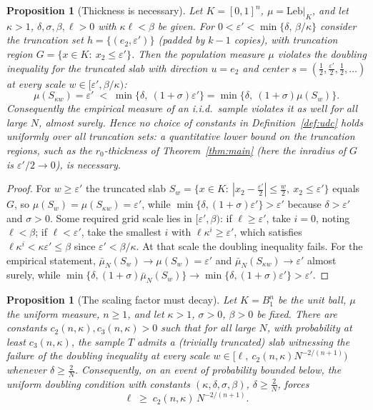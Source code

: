 \documentclass[11pt]{article}
\newtheorem{proposition}[theorem]{Proposition}
\newcommand{\emp}{\bar\mu_N}
\begin{document}
\begin{proposition}[Thickness is necessary]\label{prop:sliver}
Let $K=[0,1]^n$, $\mu=\mathrm{Leb}|_K$, and let $\kappa>1$,
$\delta,\sigma,\beta,\ell>0$ with $\kappa\ell<\beta$ be given.  For
$0<\varepsilon'<\min\{\delta,\,\beta/\kappa\}$ consider the truncation set
$h=\{(e_2,\varepsilon')\}$ (padded by $k-1$ copies), with truncation region
$G=\{x\in K:\ x_2\le\varepsilon'\}$.  Then the \emph{population} measure $\mu$
violates the doubling inequality for the truncated slab with direction $u=e_2$ and
center $s=(\tfrac12,\tfrac{\varepsilon'}2,\tfrac12,\dots)$ at every scale
$w\in[\varepsilon',\beta/\kappa)$:
\[
\mu(S_{\kappa w})=\varepsilon'
\;<\;\min\{\delta,\ (1+\sigma)\varepsilon'\}
=\min\{\delta,\ (1+\sigma)\mu(S_w)\}.
\]
Consequently the empirical measure of an i.i.d.\ sample violates it as well for all
large $N$, almost surely.  Hence no choice of constants in
Definition~\ref{def:udc} holds uniformly over all truncation sets: a quantitative
lower bound on the truncation regions, such as the $r_0$-thickness of
Theorem~\ref{thm:main} (here the inradius of $G$ is $\varepsilon'/2\to0$), is
necessary.
\end{proposition}

\begin{proof}
For $w\ge\varepsilon'$ the truncated slab
$S_w=\{x\in K:\ |x_2-\tfrac{\varepsilon'}2|\le\tfrac w2,\ x_2\le\varepsilon'\}$
equals $G$, so $\mu(S_w)=\mu(S_{\kappa w})=\varepsilon'$, while
$\min\{\delta,(1+\sigma)\varepsilon'\}>\varepsilon'$ because
$\delta>\varepsilon'$ and $\sigma>0$.  Some required grid scale lies in
$[\varepsilon',\beta)$: if $\ell\ge\varepsilon'$, take $i=0$, noting
$\ell<\beta$; if $\ell<\varepsilon'$, take the smallest $i$ with
$\ell\kappa^i\ge\varepsilon'$, which satisfies
$\ell\kappa^i<\kappa\varepsilon'\le\beta$ since $\varepsilon'<\beta/\kappa$.  At
that scale the doubling inequality fails.  For the empirical
statement, $\emp(S_w)\to\mu(S_w)=\varepsilon'$ and
$\emp(S_{\kappa w})\to\varepsilon'$ almost surely, while
$\min\{\delta,(1+\sigma)\emp(S_w)\}\to\min\{\delta,(1+\sigma)\varepsilon'\}
>\varepsilon'$.
\end{proof}

\begin{proposition}[The scaling factor must decay]\label{prop:gap}
Let $K=B^n_1$ be the unit ball, $\mu$ the uniform measure, $n\ge1$, and let
$\kappa>1$, $\sigma>0$, $\beta>0$ be fixed.  There are constants
$c_2(n,\kappa),c_3(n,\kappa)>0$ such that for all large $N$, with probability at
least $c_3(n,\kappa)$, the sample $T$ admits a (trivially truncated) slab witnessing the failure
of the doubling inequality at every scale
$w\in\bigl[\ell,\ c_2(n,\kappa)N^{-2/(n+1)}\bigr)$ whenever $\delta\ge\frac2N$.
Consequently, on an event of probability bounded below, the uniform doubling
condition with constants $(\kappa,\delta,\sigma,\beta)$, $\delta\ge\frac2N$, forces
\[
\ell\;\ge\;c_2(n,\kappa)\,N^{-2/(n+1)} .
\]
\end{proposition}
\end{document}
